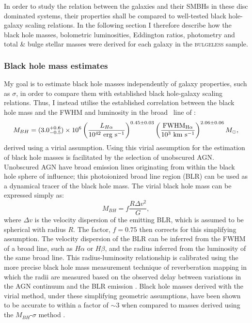 In order to study the relation between the galaxies and their SMBHs in these disc dominated systems, their properties shall be compared to well-tested black hole-galaxy scaling relations. In the following section I therefore describe how the black hole masses, bolometric luminosities, Eddington ratios, photometry and total \& bulge stellar masses were derived for each galaxy in the \textsc{bulgeless} sample. 

\subsubsection{Black hole mass estimates}\label{sec:bhmass}

My goal is to estimate black hole masses independently of galaxy properties, such as $\sigma$, in order to compare them with established black hole-galaxy scaling relations. Thus, I instead utilise the established correlation between the black hole mass and the FWHM and luminosity in the broad \ha\ line of \citet{gh07a}: 
\begin{equation}\label{greeneho}
M_{BH} = (3.0^{+0.6}_{-0.5}) \times 10^6 \left ( \frac{L_{H\alpha}}{10^{42} ~\rm{erg}~\rm{s}^{-1}} \right )^{0.45\pm0.03} \left ( \frac{\rm{FWHM}_{H\alpha}}{10^{3}~\rm{km}~\rm{s}^{-1}} \right )^{2.06\pm0.06} M_{\odot},
\end{equation}
derived using a virial assumption. Using this virial assumption for the estimation of black hole masses is facilitated by the selection of unobscured AGN. Unobscured AGN have broad emission lines originating from within the black hole sphere of influence; this photoionized broad line region (BLR) can be used as a dynamical tracer of the black hole mass. The virial black hole mass \citep{peterson14} can be expressed simply as:
\begin{equation}\label{eq:virial}
M_{BH} = f \frac{R\Delta v^2}{G},
\end{equation}
where $\Delta v$ is the velocity dispersion of the emitting BLR, which is assumed to be spherical with radius $R$. The factor, $f = 0.75$ \citep{netzer90} then corrects for this simplifying assumption. The velocity dispersion of the BLR can be inferred from the FWHM of a broad line, such as $H\alpha$ or $H\beta$, and the radius inferred from the luminosity of the same broad line. This radius-luminosity relationship is calibrated using the more precise black hole mass measurement technique of reverberation mapping \citep{blandford82, peterson01, barth15} in which the radii are measured based on the observed delay between variations in the AGN continuum and the BLR emission \citep{kaspi05, bentz06}. Black hole masses derived with the virial method, under these simplifying geometric assumptions, have been shown to be accurate to within a factor of $\sim 3$ when compared to masses derived using the $M_{BH}$-$\sigma$ method \citep[][and see Section~\ref{agnsample}]{ferrarese01, nelson04, onken04}.

